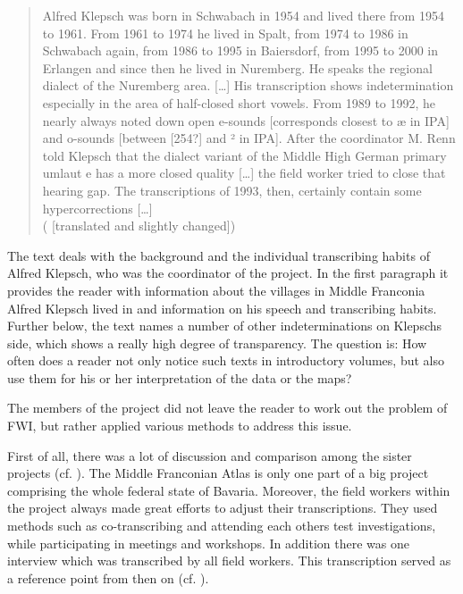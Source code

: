 \documentclass[output=paper]{LSP/langsci}
\begin{document}
\begin{quote}
Alfred Klepsch was born in Schwabach in 1954 and lived there from 1954 to 1961. From 1961 to 1974 he lived in Spalt, from 1974 to 1986 in Schwabach again, from 1986 to 1995 in Baiersdorf, from 1995 to 2000 in Erlangen and since then he lived in Nuremberg. He speaks the regional dialect of the Nuremberg area. […] His transcription shows indetermination especially in the area of half-closed short vowels. From 1989 to 1992, he nearly always noted down open e-sounds [corresponds closest to æ in IPA] and o-sounds [between [254?] and ² in IPA]. After the coordinator M. Renn told Klepsch that the dialect variant of the Middle High German primary umlaut e has a more closed quality […] the field worker tried to close that {\textquotedbl}hearing gap{\textquotedbl}. The transcriptions of 1993, then, certainly contain some hypercorrections […]\\(\citealt[47]{klepsch_sprachatlas_2013} [translated and slightly changed])
\end{quote}

The text deals with the background and the individual transcribing habits of Alfred Klepsch, who was the coordinator of the project. In the first paragraph it provides the reader with information about the villages in Middle Franconia Alfred Klepsch lived in and information on his speech and transcribing habits. Further below, the text names a number of other indeterminations on Klepsch{\textquotesingle}s side, which shows a really high degree of transparency. The question is: How often does a reader not only notice such texts in introductory volumes, but also use them for his or her interpretation of the data or the maps?

The members of the project did not leave the reader to work out the problem of FWI, but rather applied various methods to address this issue.

First of all, there was a lot of discussion and comparison among the sister projects (cf. \citealt[25 ff.]{klepsch_wie_2013}). The Middle Franconian Atlas is only one part of a big project comprising the whole federal state of Bavaria. Moreover, the field workers within the project always made great efforts to adjust their transcriptions. They used methods such as co-transcribing and attending each other{\textquotesingle}s test investigations, while participating in meetings and workshops. In addition there was one interview which was transcribed by all field workers. This transcription served as a reference point from then on (cf. \citealt[26]{klepsch_wie_2013}).
\end{document}
